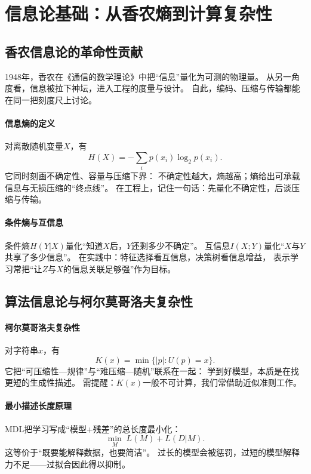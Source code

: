 \section{信息论基础：从香农熵到计算复杂性}

\subsection{香农信息论的革命性贡献}

1948年，香农在《通信的数学理论》中把“信息”量化为可测的物理量。  
从另一角度看，信息被拉下神坛，进入工程的度量与设计。  
自此，编码、压缩与传输都能在同一把刻度尺上讨论。

\paragraph{信息熵的定义}
对离散随机变量$X$，有
$$H(X) = -\sum_{i} p(x_i)\log_2 p(x_i).$$
它同时刻画不确定性、容量与压缩下界：  
不确定性越大，熵越高；熵给出可承载信息与无损压缩的“终点线”。  
在工程上，记住一句话：先量化不确定性，后谈压缩与传输。

\paragraph{条件熵与互信息}
条件熵$H(Y|X)$量化“知道$X$后，$Y$还剩多少不确定”。  
互信息$I(X;Y)$量化“$X$与$Y$共享了多少信息”。  
在实践中：特征选择看互信息，决策树看信息增益，  
表示学习常把“让$Z$与$X$的信息关联足够强”作为目标。

\subsection{算法信息论与柯尔莫哥洛夫复杂性}

\paragraph{柯尔莫哥洛夫复杂性}
对字符串$x$，有
$$K(x)=\min\{|p|:U(p)=x\}.$$
它把“可压缩性—规律”与“难压缩—随机”联系在一起：  
学到好模型，本质是在找更短的生成性描述。  
需提醒：$K(x)$一般不可计算，我们常借助近似准则工作。

\paragraph{最小描述长度原理}
MDL把学习写成“模型+残差”的总长度最小化：
$$\min_M\;L(M)+L(D|M).$$
这等价于“既要能解释数据，也要简洁”。  
过长的模型会被惩罚，过短的模型解释力不足——\;过拟合因此得以抑制。

